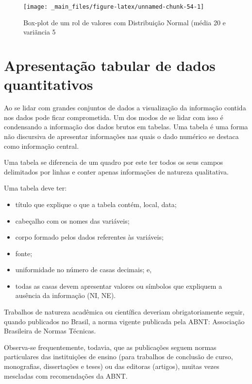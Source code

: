\documentclass[
]{book}
\providecommand{\tightlist}{%
  \setlength{\itemsep}{0pt}\setlength{\parskip}{0pt}}
\begin{document}
\begin{figure}

{\centering \texttt{[image: \_main\_files/figure-latex/unnamed-chunk-54-1]} 

}

\caption{Box-plot de um rol de valores com Distribuição Normal (média 20 e variãncia 5}\label{fig:unnamed-chunk-54}
\end{figure}

\hypertarget{apresentauxe7uxe3o-tabular-de-dados-quantitativos}{%
\section{Apresentação tabular de dados quantitativos}\label{apresentauxe7uxe3o-tabular-de-dados-quantitativos}}

Ao se lidar com grandes conjuntos de dados a visualização da informação contida nos dados pode ficar comprometida. Um dos modos de se lidar com isso é condensando a informação dos dados brutos em tabelas. Uma tabela é uma forma não discursiva de apresentar informações nas quais o dado numérico se destaca como informação central.

Uma tabela se diferencia de um quadro por este ter todos os seus campos delimitados por linhas e conter apenas informações de natureza qualitativa.

Uma tabela deve ter:

\begin{itemize}
\tightlist
\item
  título que explique o que a tabela contém, local, data;
\item
  cabeçalho com os nomes das variáveis;
\item
  corpo formado pelos dados referentes às variáveis;
\item
  fonte;
\item
  uniformidade no número de casas decimais; e,
\item
  todas as casas devem apresentar valores ou símbolos que expliquem a ausência da informação (NI, NE).
\end{itemize}

Trabalhos de natureza acadêmica ou científica deveriam obrigatoriamente seguir, quando publicados no Brasil, a norma vigente publicada pela ABNT: Associação Brasileira de Normas Técnicas.

Observa-se frequentemente, todavia, que as publicações seguem normas particulares das instituições de ensino (para trabalhos de conclusão de curso, monografias, dissertações e teses) ou das editoras (artigos), muitas vezes mescladas com recomendações da ABNT.
\end{document}
